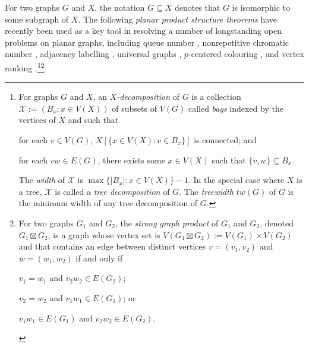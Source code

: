 \documentclass{patmorin}
\begin{document}
For two graphs $G$ and $X$, the notation $G\subseteq X$ denotes that $G$ is isomorphic to some subgraph of $X$. 
The following \emph{planar product structure theorems} have recently been used as a key tool in resolving a number of longstanding open problems on planar graphs, including queue number \cite{dujmovic.joret.ea:planar}, nonrepetitive chromatic number \cite{dujmovic.esperet.ea:planar}, adjacency labelling \cite{dujmovic.esperet.ea:adjacency}, universal graphs \cite{esperet.joret.ea:sparse}, $p$-centered colouring \cite{debski.felsner.ea:improved}, and vertex ranking \cite{bose.dujmovic.ea:asymptotically}.\footnote{For graphs $G$ and $X$, an \emph{$X$-decomposition} of $G$ is a collection $\mathcal{X}:=(B_x:x\in V(X))$ of subsets of $V(G)$ called \emph{bags} indexed by the vertices of $X$ and such that
 \begin{inparaenum}[(i)]
     \item for each $v\in V(G)$, $X[\{x\in V(X):v\in B_x\}]$ is connected; and
     \item for each $vw\in E(G)$, there exists some $x\in V(X)$ such that $\{v,w\}\subseteq B_x$.
\end{inparaenum}
The \emph{width} of $\mathcal{X}$ is $\max\{|B_x|:x\in V(X)\}-1$. In the special case where $X$ is a tree, $\mathcal{X}$ is called a \emph{tree decomposition} of $G$. The \emph{treewidth} $tw(G)$ of $G$ is the minimum width of any tree decomposition of $G$.}\footnote{
For two graphs $G_1$ and $G_2$, the \emph{strong graph product} of $G_1$ and $G_2$, denoted $G_1\boxtimes G_2$, is a graph whose vertex set is $V(G_1\boxtimes G_2):= V(G_1)\times V(G_2)$ and that contains an edge between distinct vertices $v=(v_1,v_2)$ and $w=(w_1,w_2)$ if and only if
\begin{inparaenum}[(i)]
    \item $v_1=w_1$ and $v_2w_2\in E(G_2)$;
    \item $v_2=w_2$ and $v_1w_1\in E(G_1)$; or
    \item $v_1w_1\in E(G_1)$ and $v_2w_2\in E(G_2)$.
\end{inparaenum}
}



\end{document}
